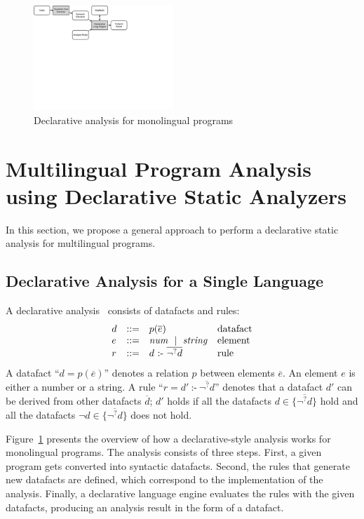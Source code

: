 \begin{figure}[t]
  \centering
  \vspace{2mm}
  \includegraphics[width=0.47\textwidth]{img/overview}
  \caption{Declarative analysis for monolingual programs}
  \label{fig:overview}
\end{figure}

\section{Multilingual Program Analysis using Declarative Static Analyzers}
\label{sec:approach}

In this section, we propose a general approach to perform a declarative
static analysis for multilingual programs.

\subsection{Declarative Analysis for a Single Language}

A declarative analysis~\cite{doop} consists of datafacts and rules:
\[
  \begin{array}{llll}
d & ::= & p(\overline{e}) & \mbox{datafact}\\
e & ::= & \mbox{\textit{num}}~\mid~\mbox{\textit{string}} & \mbox{element}\\
r & ::= & d\ \mbox{:-}\ \overline{\neg^? d} & \mbox{rule}
\end{array}
\]
A datafact ``$d = p(\overline{e})$'' denotes a relation $p$ between elements $\overline{e}$.
An element $e$ is either a number or a string.
A rule ``$r = d'\ \mbox{:-}\ \overline{\neg^? d}$'' denotes that
a datafact $d'$ can be derived from other datafacts $\overline{d}$;
$d'$ holds if all the datafacts $d \in \{\overline{\neg^? d}\}$ hold
and all the datafacts $\neg d \in \{\overline{\neg^? d}\}$ does not hold.

Figure~\ref{fig:overview} presents the overview of how a
declarative-style analysis works for monolingual programs.
The analysis consists of three steps.
First, a given program gets converted into syntactic datafacts.
Second, the rules that generate new datafacts are defined, which
correspond to the implementation of the analysis.
Finally, a declarative language engine evaluates the rules with the given datafacts,
producing an analysis result in the form of a datafact.

